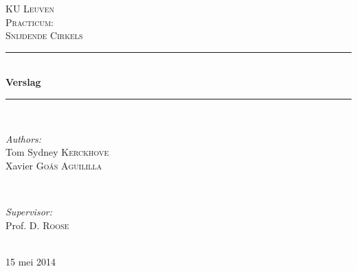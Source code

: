 \begin{titlepage}
\thispagestyle{empty}
\newcommand{\HRule}{\rule{\linewidth}{0.5mm}}
\center
\textsc{\LARGE KU Leuven}\\[1.5cm]
\textsc{\Large Practicum:}\\[0.5cm]
\textsc{\large Snijdende Cirkels}\\[0.5cm]

\HRule \\[0.4cm]
{ \Huge \bfseries Verslag}\\[0.4cm]
\HRule \\[1.5cm]

\begin{minipage}{0.4\textwidth}
\begin{flushleft} \large
\emph{Authors:}\\
Tom Sydney \textsc{Kerckhove}\\
Xavier \textsc{Go\'as Aguililla}
\end{flushleft}
\end{minipage}
~
\begin{minipage}{0.4\textwidth}
\begin{flushright} \large
\emph{Supervisor:} \\
Prof. D. \textsc{Roose}
\end{flushright}
\end{minipage}\\[4cm]

{\large 15 mei 2014}\\[3cm]
\vfill

\end{titlepage}

